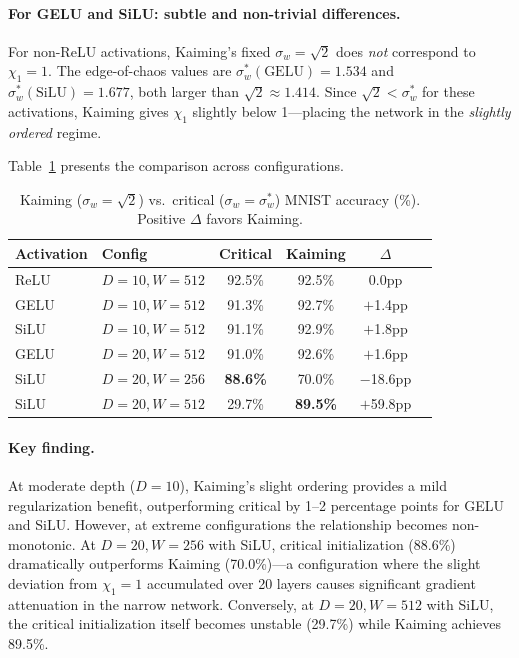 \documentclass[10pt]{article}
\begin{document}
\paragraph{For GELU and SiLU: subtle and non-trivial differences.}
For non-ReLU activations, Kaiming's fixed $\sigma_w = \sqrt{2}$ does \emph{not} correspond to $\chi_1 = 1$.
The edge-of-chaos values are $\sigma_w^*(\text{GELU}) = 1.534$ and $\sigma_w^*(\text{SiLU}) = 1.677$, both larger than $\sqrt{2} \approx 1.414$.
Since $\sqrt{2} < \sigma_w^*$ for these activations, Kaiming gives $\chi_1$ slightly below 1---placing the network in the \emph{slightly ordered} regime.

Table~\ref{tab:kaiming-vs-critical} presents the comparison across configurations.

\begin{table}[t]
\centering
\caption{Kaiming ($\sigma_w\!=\!\sqrt{2}$) vs.\ critical ($\sigma_w\!=\!\sigma_w^*$) MNIST accuracy (\%).  Positive $\Delta$ favors Kaiming.}
\label{tab:kaiming-vs-critical}
\small
\begin{tabular}{@{}llcccr@{}}
\toprule
\textbf{Activation} & \textbf{Config} & \textbf{Critical} & \textbf{Kaiming} & $\Delta$ \\
\midrule
ReLU & $D\!=\!10, W\!=\!512$ & 92.5\% & 92.5\% & 0.0pp \\
GELU & $D\!=\!10, W\!=\!512$ & 91.3\% & 92.7\% & $+$1.4pp \\
SiLU & $D\!=\!10, W\!=\!512$ & 91.1\% & 92.9\% & $+$1.8pp \\
GELU & $D\!=\!20, W\!=\!512$ & 91.0\% & 92.6\% & $+$1.6pp \\
\midrule
SiLU & $D\!=\!20, W\!=\!256$ & \textbf{88.6\%} & 70.0\% & $-$18.6pp \\
SiLU & $D\!=\!20, W\!=\!512$ & 29.7\% & \textbf{89.5\%} & $+$59.8pp \\
\bottomrule
\end{tabular}
\end{table}

\paragraph{Key finding.}
At moderate depth ($D\!=\!10$), Kaiming's slight ordering provides a mild regularization benefit, outperforming critical by 1--2 percentage points for GELU and SiLU.
However, at extreme configurations the relationship becomes non-monotonic.
At $D\!=\!20, W\!=\!256$ with SiLU, critical initialization (88.6\%) dramatically outperforms Kaiming (70.0\%)---a configuration where the slight deviation from $\chi_1=1$ accumulated over 20 layers causes significant gradient attenuation in the narrow network.
Conversely, at $D\!=\!20, W\!=\!512$ with SiLU, the critical initialization itself becomes unstable (29.7\%) while Kaiming achieves 89.5\%.
\end{document}
